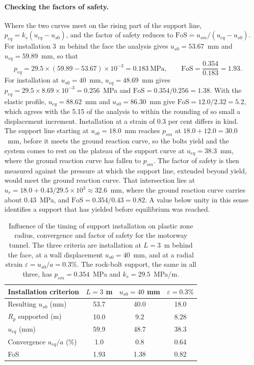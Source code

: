 \paragraph{Checking the factors of safety.}
Where the two curves meet on the rising part of the support line,
$p_{eq} = k_s(u_{eq} - u_{s0})$, and the factor of safety reduces to
$\mathrm{FoS} = u_{sm}/(u_{eq} - u_{s0})$. For installation 3~m behind the
face the analysis gives $u_{s0} = 53.67$~mm and $u_{eq} = 59.89$~mm, so that
\[
p_{eq} = 29.5 \times (59.89 - 53.67)\times 10^{-3} = 0.183~\text{MPa},
\qquad
\mathrm{FoS} = \frac{0.354}{0.183} = 1.93 .
\]
For installation at $u_{s0} = 40$~mm, $u_{eq} = 48.69$~mm gives
$p_{eq} = 29.5 \times 8.69 \times 10^{-3} = 0.256$~MPa and
$\mathrm{FoS} = 0.354/0.256 = 1.38$. With the elastic profile,
$u_{eq} = 88.62$~mm and $u_{s0} = 86.30$~mm give
$\mathrm{FoS} = 12.0/2.32 = 5.2$, which agrees with the 5.15 of the analysis
to within the rounding of so small a displacement increment. Installation at
a strain of 0.3 per cent differs in kind. The support line starting at
$u_{s0} = 18.0$~mm reaches $p_{sm}$ at $18.0 + 12.0 = 30.0$~mm, before it
meets the ground reaction curve, so the bolts yield and the system comes to
rest on the plateau of the support curve at $u_{eq} = 38.3$~mm, where the
ground reaction curve has fallen to $p_{sm}$. The factor of safety is then
measured against the pressure at which the support line, extended beyond
yield, would meet the ground reaction curve. That intersection lies at
$u_r = 18.0 + 0.43/29.5 \times 10^{3} \approx 32.6$~mm, where the ground
reaction curve carries about 0.43~MPa, and
$\mathrm{FoS} = 0.354/0.43 = 0.82$. A value below unity in this sense
identifies a support that has yielded before equilibrium was reached.

\begin{table}[htbp]
\caption{Influence of the timing of support installation on plastic zone radius, convergence and factor of safety for the motorway tunnel. The three criteria are installation at $L=3$~m behind the face, at a wall displacement $u_{s0}=40$~mm, and at a radial strain $\varepsilon=u_{s0}/a=0.3\%$. The rock-bolt support, the same in all three, has $p_{sm}=0.354$~MPa and $k_s=29.5$~MPa/m.}
\label{tab:support-timing}
\centering
\small
\begin{tabular}{lccc}
\toprule
\textbf{Installation criterion} & $L = 3$ m & $u_{s0} = 40$ mm & $\varepsilon = 0.3\%$ \\
\midrule
Resulting $u_{s0}$ (mm) & 53.7 & 40.0 & 18.0 \\
$R_p$ supported (m) & 10.0 & 9.2 & 8.28 \\
$u_{eq}$ (mm) & 59.9 & 48.7 & 38.3 \\
Convergence $u_{eq}/a$ (\%) & 1.0 & 0.8 & 0.64 \\
FoS & 1.93 & 1.38 & 0.82 \\
\bottomrule
\end{tabular}
\end{table}

